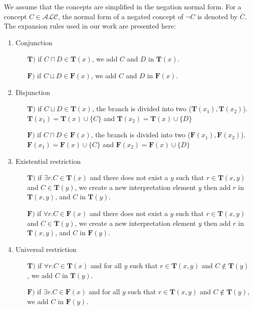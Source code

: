 \documentclass{article}
\begin{document}
We assume that the concepts are simplified in the negation normal form. For a concept $C \in \mathcal{ALC} $, the normal form of a negated concept of $\neg C$ is denoted by $\overline{C}$.
The expansion rules used in our work are presented here:
\begin{enumerate}
	 \item Conjunction
	       \begin{itemize}
	        \item  [$\mathbf{T)}$] if $C\sqcap D \in \mathbf{T}(x)$, we add $C$ and $D$ in $\mathbf{T}(x)$.
	        \item  [$\mathbf{F)}$] if $C\sqcup D \in \mathbf{F}(x)$, we add $C$ and $D$ in $\mathbf{F}(x)$.
	       \end{itemize}
	 \item Disjunction
	       \begin{itemize}
		\item  [$\mathbf{T)}$]  if $C\sqcup D \in \mathbf{T}(x)$, the branch is divided into two  ($\mathbf{T}(x_1),\mathbf{T}(x_2)$).
			$\mathbf{T}(x_1)= \mathbf{T}(x) \cup \{C\}$ and $\mathbf{T}(x_2)=\mathbf{T}(x) \cup \{D\}$
	        \item  [$\mathbf{F)}$]  if $C\sqcap D \in \mathbf{F}(x)$, the branch is divided into two ($\mathbf{F}(x_1),\mathbf{F}(x_2)$).
	        $\mathbf{F}(x_1)= \mathbf{F}(x) \cup \{C\}$ and $\mathbf{F}(x_2)=\mathbf{F}(x) \cup \{D\}$
	       \end{itemize}
	 \item Existential restriction
	       \begin{itemize}
	       \item  [$\mathbf{T)}$]  if $\exists r.C \in \mathbf{T}(x)$ and there does not exist a $y$ such that $r \in \mathbf{T}(x,y)$ and $C \in \mathbf{T}(y)$, 
	       we create a new interpretation element $y$  then add $r$ in  $\mathbf{T}(x,y)$, and $C$ in $\mathbf{T}(y)$.
	        \item  [$\mathbf{F)}$]  if $\forall r.C \in \mathbf{F}(x)$ and there does not exist a $y$ such that $r \in \mathbf{T}(x,y)$ and $C \in \mathbf{T}(y)$, 
	       we create a new interpretation element $y$ then add $r$ in  $\mathbf{T}(x,y)$, and $C$ in $\mathbf{F}(y)$.
	       \end{itemize}
	 \item Universal restriction
	       \begin{itemize}
 	        \item  [$\mathbf{T)}$]  if $\forall r.C \in \mathbf{T}(x)$ and for all $y$ such that $r \in \mathbf{T}(x,y)$ and $C\notin\mathbf{T}(y)$, we add $C$ in  $\mathbf{T}(y)$.
	        \item  [$\mathbf{F)}$]  if $\exists r.C \in \mathbf{F}(x)$ and for all $y$ such that $r \in \mathbf{T}(x,y)$ and $C\notin\mathbf{T}(y)$, we add $C$ in  $\mathbf{F}(y)$.
	       \end{itemize}	


\end{enumerate}
\end{document}
